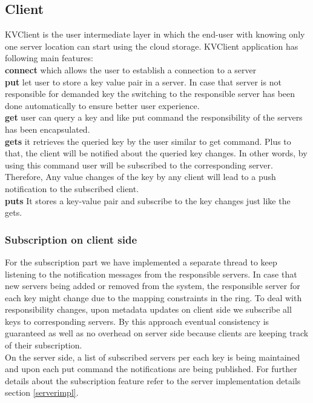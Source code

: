 \documentclass{sig-alternate}
\begin{document}
\subsection{Client}
KVClient is the user intermediate layer in which the end-user with knowing only one server location can start using the cloud storage. KVClient application has following main features: \\
\textbf{connect} which allows the user to establish a connection to a server\\
\textbf{put} let user to store a key value pair in a server. In case that server is not responsible for demanded key the switching to the responsible server has been done automatically to ensure better user experience.\\
\textbf{get} user can query a key and like put command the responsibility of the servers has been encapsulated.\\
\textbf{gets} it retrieves the queried key by the user similar to get command. Plus to that, the client will be notified about the queried  key changes. In other words, by using this command user will be subscribed to the corresponding server. Therefore, Any value changes of the key by any client will lead to a push notification to the subscribed client.\\
\textbf{puts} It stores a key-value pair and subscribe to the key changes just like the gets.\\
\subsubsection{Subscription on client side}
For the subscription part we have implemented a separate thread to keep listening to the notification messages from the responsible servers. In case that new servers being added or removed from the system, the responsible server for each key might change due to the mapping constraints in the ring. To deal with responsibility changes, upon metadata updates on client side we subscribe all keys to corresponding servers. By this approach eventual consistency is guaranteed as well as no overhead on server side because clients are keeping track of their subscription.\\ 
On the server side, a list of subscribed servers per each key is being maintained and upon each put command the notifications are being published. For further details about the subscription feature refer to the server implementation details section \ref{serverimpl}.
\end{document}
